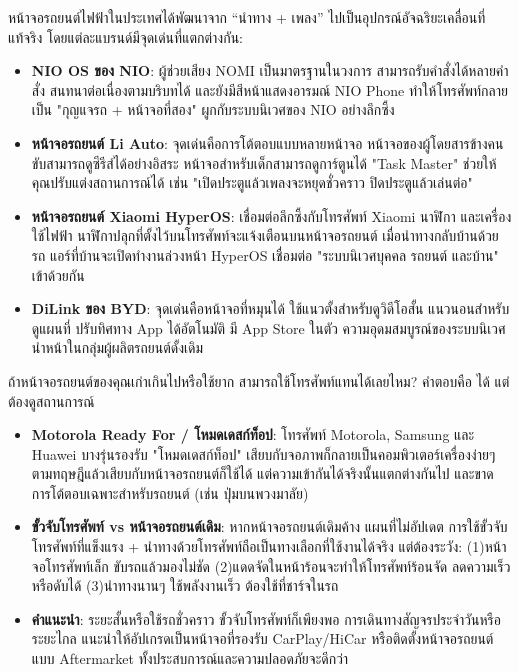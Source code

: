 
หน้าจอรถยนต์ไฟฟ้าในประเทศได้พัฒนาจาก “นำทาง + เพลง” ไปเป็นอุปกรณ์อัจฉริยะเคลื่อนที่แท้จริง โดยแต่ละแบรนด์มีจุดเด่นที่แตกต่างกัน:

\begin{itemize}
  \item \textbf{NIO OS ของ NIO}: ผู้ช่วยเสียง NOMI เป็นมาตรฐานในวงการ สามารถรับคำสั่งได้หลายคำสั่ง สนทนาต่อเนื่องตามบริบทได้ และยังมีสีหน้าแสดงอารมณ์ NIO Phone ทำให้โทรศัพท์กลายเป็น "กุญแจรถ + หน้าจอที่สอง" ผูกกับระบบนิเวศของ NIO อย่างลึกซึ้ง
  \item \textbf{หน้าจอรถยนต์ Li Auto}: จุดเด่นคือการโต้ตอบแบบหลายหน้าจอ หน้าจอของผู้โดยสารข้างคนขับสามารถดูซีรีส์ได้อย่างอิสระ หน้าจอสำหรับเด็กสามารถดูการ์ตูนได้ "Task Master" ช่วยให้คุณปรับแต่งสถานการณ์ได้ เช่น "เปิดประตูแล้วเพลงจะหยุดชั่วคราว ปิดประตูแล้วเล่นต่อ"
  \item \textbf{หน้าจอรถยนต์ Xiaomi HyperOS}: เชื่อมต่อลึกซึ้งกับโทรศัพท์ Xiaomi นาฬิกา และเครื่องใช้ไฟฟ้า นาฬิกาปลุกที่ตั้งไว้บนโทรศัพท์จะแจ้งเตือนบนหน้าจอรถยนต์ เมื่อนำทางกลับบ้านด้วยรถ แอร์ที่บ้านจะเปิดทำงานล่วงหน้า HyperOS เชื่อมต่อ "ระบบนิเวศบุคคล รถยนต์ และบ้าน" เข้าด้วยกัน
  \item \textbf{DiLink ของ BYD}: จุดเด่นคือหน้าจอที่หมุนได้ ใช้แนวตั้งสำหรับดูวิดีโอสั้น แนวนอนสำหรับดูแผนที่ ปรับทิศทาง App ได้อัตโนมัติ มี App Store ในตัว ความอุดมสมบูรณ์ของระบบนิเวศนำหน้าในกลุ่มผู้ผลิตรถยนต์ดั้งเดิม
\end{itemize}


ถ้าหน้าจอรถยนต์ของคุณเก่าเกินไปหรือใช้ยาก สามารถใช้โทรศัพท์แทนได้เลยไหม? คำตอบคือ ได้ แต่ต้องดูสถานการณ์

\begin{itemize}
  \item \textbf{Motorola Ready For / โหมดเดสก์ท็อป}: โทรศัพท์ Motorola, Samsung และ Huawei บางรุ่นรองรับ "โหมดเดสก์ท็อป" เสียบกับจอภาพก็กลายเป็นคอมพิวเตอร์เครื่องง่ายๆ ตามทฤษฎีแล้วเสียบกับหน้าจอรถยนต์ก็ใช้ได้ แต่ความเข้ากันได้จริงนั้นแตกต่างกันไป และขาดการโต้ตอบเฉพาะสำหรับรถยนต์ (เช่น ปุ่มบนพวงมาลัย)
  \item \textbf{ขั้วจับโทรศัพท์ vs หน้าจอรถยนต์เดิม}: หากหน้าจอรถยนต์เดิมค้าง แผนที่ไม่อัปเดต การใช้ขั้วจับโทรศัพท์ที่แข็งแรง + นำทางด้วยโทรศัพท์ถือเป็นทางเลือกที่ใช้งานได้จริง แต่ต้องระวัง: (1)หน้าจอโทรศัพท์เล็ก ขับรถแล้วมองไม่ชัด (2)แดดจัดในหน้าร้อนจะทำให้โทรศัพท์ร้อนจัด ลดความเร็วหรือดับได้ (3)นำทางนานๆ ใช้พลังงานเร็ว ต้องใช้ที่ชาร์จในรถ
  \item \textbf{คำแนะนำ}: ระยะสั้นหรือใช้รถชั่วคราว ขั้วจับโทรศัพท์ก็เพียงพอ การเดินทางสัญจรประจำวันหรือระยะไกล แนะนำให้อัปเกรดเป็นหน้าจอที่รองรับ CarPlay/HiCar หรือติดตั้งหน้าจอรถยนต์แบบ Aftermarket ทั้งประสบการณ์และความปลอดภัยจะดีกว่า
\end{itemize}

